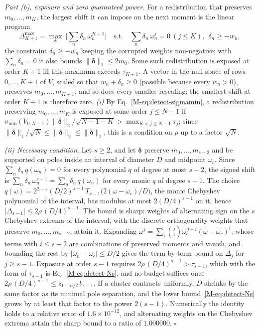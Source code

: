 \documentclass[aps,prb,onecolumn,superscriptaddress,longbibliography,floatfix]{revtex4-2}
\begin{document}
\emph{Part (b), exposure and zero guaranteed power.} For a redistribution that preserves $m_0,\dots,m_K$, the largest shift it can impose on the next moment is the linear program
\begin{equation}
\Delta_{K+1}^{\max}=\max_{\bm{\delta}}\ \Big|\textstyle\sum_n \delta_n\,\omega_n^{K+1}\Big|\quad\text{s.t.}\quad\textstyle\sum_n\delta_n\,\omega_n^{j}=0\ (j\le K),\ \ \delta_n\ge -w_n,
\label{eq:wclp}
\end{equation}
the constraint $\delta_n\ge-w_n$ keeping the corrupted weights non-negative; with $\sum_n\delta_n=0$ it also bounds $\|\bm{\delta}\|_1\le2m_0$. Some such redistribution is exposed at order $K+1$ iff this maximum exceeds $\tau_{K+1}$. A vector in the null space of rows $0,\dots,K{+}1$ of $V$, scaled so that $w_n+\delta_n\ge0$ (possible because every $w_n>0$), preserves $m_0,\dots,m_{K+1}$, and so does every smaller rescaling; the smallest shift at order $K{+}1$ is therefore zero. \emph{(i)} By Eq.~\eqref{M-eq:detect-sigmamin}, a redistribution preserving $m_0,\dots,m_K$ is exposed at some order $j\le N-1$ if $\sigma_{\min}(V_{0:N-1})\|\bm{\delta}\|_2/\sqrt{N-1-K}>\max_{K<j\le N-1}\tau_j$; since $\|\bm{\delta}\|_1/\sqrt{N}\le\|\bm{\delta}\|_2\le\|\bm{\delta}\|_1$, this is a condition on $\rho$ up to a factor $\sqrt{N}$.

\emph{(ii) Necessary condition.} Let $s\ge2$, and let $\bm{\delta}$ preserve $m_0,\dots,m_{s-2}$ and be supported on poles inside an interval of diameter $D$ and midpoint $\omega_c$. Since $\sum_n\delta_n\,q(\omega_n)=0$ for every polynomial $q$ of degree at most $s-2$, the signed shift is $\sum_n\delta_n\,\omega_n^{s-1}=\sum_n\delta_n\,q(\omega_n)$ for every monic $q$ of degree $s-1$. The choice $q(\omega)=2^{2-s}(D/2)^{s-1}\,T_{s-1}\big(2(\omega-\omega_c)/D\big)$, the monic Chebyshev polynomial of the interval, has modulus at most $2(D/4)^{s-1}$ on it, hence $|\Delta_{s-1}|\le2\rho\,(D/4)^{s-1}$. The bound is sharp: weights of alternating sign on the $s$ Chebyshev extrema of the interval, with the discrete orthogonality weights that preserve $m_0,\dots,m_{s-2}$, attain it. Expanding $\omega^{j}=\sum_i\binom{j}{i}\omega_c^{\,j-i}(\omega-\omega_c)^i$, whose terms with ${i\le s-2}$ are combinations of preserved moments and vanish, and bounding the rest by $|\omega_n-\omega_c|\le D/2$ gives the term-by-term bound on $\Delta_j$ for $j\ge s-1$. Exposure at order $s-1$ requires $2\rho\,(D/4)^{s-1}>\tau_{s-1}$, which with the form of $\tau_{s-1}$ is Eq.~\eqref{M-eq:detect-Ns}, and no budget suffices once $2\rho\,(D/4)^{s-1}\le z_{1-\alpha/2}\,b_{s-1}$. If a cluster contracts uniformly, $D$ shrinks by the same factor as its minimal pole separation, and the lower bound~\eqref{M-eq:detect-Ns} grows by at least that factor to the power $2(s-1)$. Numerically the identity holds to a relative error of $1.6\times10^{-12}$, and alternating weights on the Chebyshev extrema attain the sharp bound to a ratio of $1.000000$. $\square$
\end{document}
